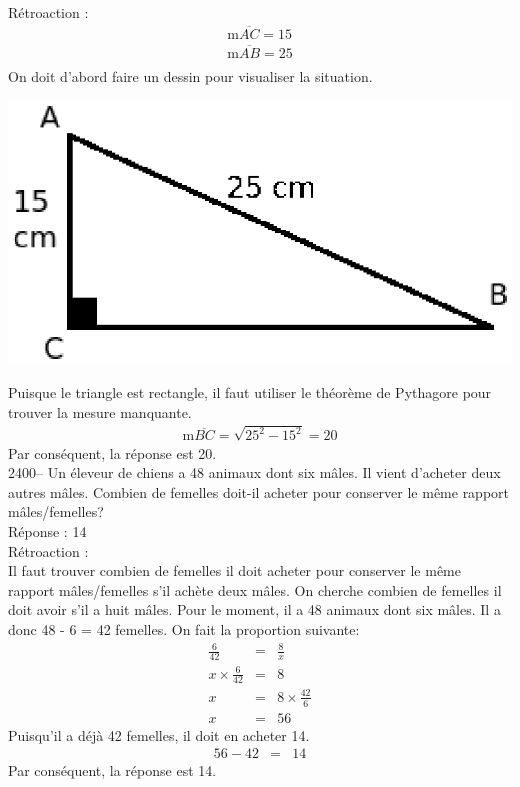 \documentclass[letterpaper, 12pt]{article}
\begin{document}
R\'etroaction :
\begin{eqnarray*}
  \textrm{m} \overline{AC}= 15\\
  \textrm{m} \overline{AB}= 25\\
\end{eqnarray*}
On doit d'abord faire un dessin pour visualiser la situation.
\begin{center}
 \includegraphics[width=6 cm,bb=0 628 305 842]{Q2399.eps}
\end{center}
Puisque le triangle est rectangle, il faut utiliser le th\'eor\`eme de Pythagore pour trouver la mesure manquante.
\begin{eqnarray*}
 \textrm{m} \overline{BC} = \sqrt{25^{2}-15^{2}} = 20
\end{eqnarray*}
Par cons\'equent, la r\'eponse est 20.\\

2400-- Un \'eleveur de chiens a 48 animaux dont six m\^ales. Il vient d'acheter deux autres m\^ales. Combien de femelles doit-il acheter pour conserver le m\^eme rapport m\^ales/femelles?\\

R\'eponse : 14\\

R\'etroaction :\\
Il faut trouver combien de femelles il doit acheter pour conserver le m\^eme rapport m\^ales/femelles s'il ach\`ete deux m\^ales. On cherche combien de femelles il doit avoir s'il a huit m\^ales. Pour le moment, il a 48 animaux dont six m\^ales. Il a donc 48 - 6 = 42 femelles. On fait la proportion suivante:
\begin{eqnarray*}
 \frac{6}{42}&=&\frac{8}{x}\\[2mm]
x \times  \frac{6}{42}&=&8\\[2mm]
x &=&8 \times \frac{42}{6}\\[2mm]
x &=&56
\end{eqnarray*}
Puisqu'il a d\'ej\`a 42 femelles, il doit en acheter 14.
\begin{eqnarray*}
 56 - 42 &=& 14
\end{eqnarray*}
Par cons\'equent, la r\'eponse est 14.\\
\end{document}

